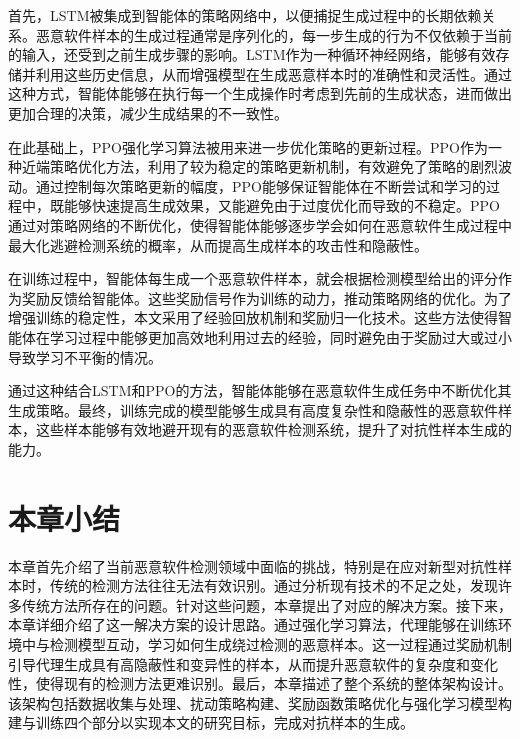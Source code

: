 首先，LSTM被集成到智能体的策略网络中，以便捕捉生成过程中的长期依赖关系。恶意软件样本的生成过程通常是序列化的，每一步生成的行为不仅依赖于当前的输入，还受到之前生成步骤的影响。LSTM作为一种循环神经网络，能够有效存储并利用这些历史信息，从而增强模型在生成恶意样本时的准确性和灵活性。通过这种方式，智能体能够在执行每一个生成操作时考虑到先前的生成状态，进而做出更加合理的决策，减少生成结果的不一致性。

在此基础上，PPO强化学习算法被用来进一步优化策略的更新过程。PPO作为一种近端策略优化方法，利用了较为稳定的策略更新机制，有效避免了策略的剧烈波动。通过控制每次策略更新的幅度，PPO能够保证智能体在不断尝试和学习的过程中，既能够快速提高生成效果，又能避免由于过度优化而导致的不稳定。PPO通过对策略网络的不断优化，使得智能体能够逐步学会如何在恶意软件生成过程中最大化逃避检测系统的概率，从而提高生成样本的攻击性和隐蔽性。

在训练过程中，智能体每生成一个恶意软件样本，就会根据检测模型给出的评分作为奖励反馈给智能体。这些奖励信号作为训练的动力，推动策略网络的优化。为了增强训练的稳定性，本文采用了经验回放机制和奖励归一化技术。这些方法使得智能体在学习过程中能够更加高效地利用过去的经验，同时避免由于奖励过大或过小导致学习不平衡的情况。

通过这种结合LSTM和PPO的方法，智能体能够在恶意软件生成任务中不断优化其生成策略。最终，训练完成的模型能够生成具有高度复杂性和隐蔽性的恶意软件样本，这些样本能够有效地避开现有的恶意软件检测系统，提升了对抗性样本生成的能力。

\section{本章小结}

本章首先介绍了当前恶意软件检测领域中面临的挑战，特别是在应对新型对抗性样本时，传统的检测方法往往无法有效识别。通过分析现有技术的不足之处，发现许多传统方法所存在的问题。针对这些问题，本章提出了对应的解决方案。接下来，本章详细介绍了这一解决方案的设计思路。通过强化学习算法，代理能够在训练环境中与检测模型互动，学习如何生成绕过检测的恶意样本。这一过程通过奖励机制引导代理生成具有高隐蔽性和变异性的样本，从而提升恶意软件的复杂度和变化性，使得现有的检测方法更难识别。最后，本章描述了整个系统的整体架构设计。该架构包括数据收集与处理、扰动策略构建、奖励函数策略优化与强化学习模型构建与训练四个部分以实现本文的研究目标，完成对抗样本的生成。

